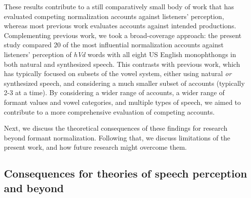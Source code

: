 \documentclass[preprint]{JASA}
\begin{document}
These results contribute to a still comparatively small body of work that has evaluated competing normalization accounts against listeners' perception, whereas most previous work evaluates accounts against intended productions. Complementing previous work, we took a broad-coverage approach: the present study compared 20 of the most influential normalization accounts against listeners' perception of \emph{hVd} words with all eight US English monophthongs in both natural and synthesized speech. This contrasts with previous work, which has typically focused on subsets of the vowel system, either using natural \emph{or} synthesized speech, and considering a much smaller subset of accounts (typically 2-3 at a time). By considering a wider range of accounts, a wider range of formant values and vowel categories, and multiple types of speech, we aimed to contribute to a more comprehensive evaluation of competing accounts.

Next, we discuss the theoretical consequences of these findings for research beyond formant normalization. Following that, we discuss limitations of the present work, and how future research might overcome them.

\subsection{Consequences for theories of speech perception and beyond}\label{consequences-for-theories-of-speech-perception-and-beyond}
\end{document}

